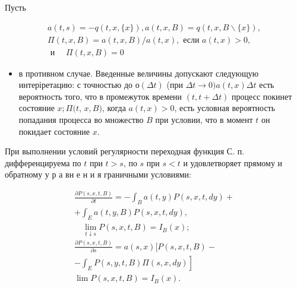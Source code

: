 \documentclass[10pt]{article}
\begin{document}
Пусть



\[

\begin{gathered}

a(t, s)=-q(t, x,\{x\}), a(t, x, B)=q(t, x, B \backslash\{x\}), \\

\Pi(t, x, B)=a(t, x, B) / a(t, x), \text { если } a(t, x)>0, \\

\text { и } \quad \Pi(t, x, B)=0

\end{gathered}

\]



\begin{itemize}

  \item в противном случае. Введенные величины допускают следующую интеріретацию: с точностью до $о(\Delta t)$ (при $\Delta t \rightarrow 0) a(t, x) \Delta t$ есть вероятность того, что в промежуток времени $(t, t+\Delta t)$ процесс покинет состояние $x ; \Pi(t$, $x, B)$, когда $a(t, x)>0$, есть условная вероятность попадания процесса во множество $B$ при условии, что в момент $t$ он покидает состояние $x$.

\end{itemize}



При выполнении условий регулярности переходная функция С. п. дифференцируема по $t$ при $t>s$, по $s$ при $s<t$ и удовлетворяет прямому и обратному у р а вн е н и я граничными условиями:



\[

\begin{gathered}

\frac{\partial P(s, x, t, B)}{\partial t}=-\int_{B} a(t, y) P(s, x, t, d y)+ \\

+\int_{E} a(t, y, B) P(s, x, t, d y), \\

\quad \lim _{t \downarrow s} P(s, x, t, B)=I_{B}(x) ; \\

\frac{\partial P(s, x, t, B)}{\partial s}=a(s, x)[P(s, x, t, B)- \\

\left.-\int_{E} P(s, y, t, B) \Pi(s, x, d y)\right] \\

\lim P(s, x, t, B)=I_{B}(x) .

\end{gathered}

\]
\end{document}
